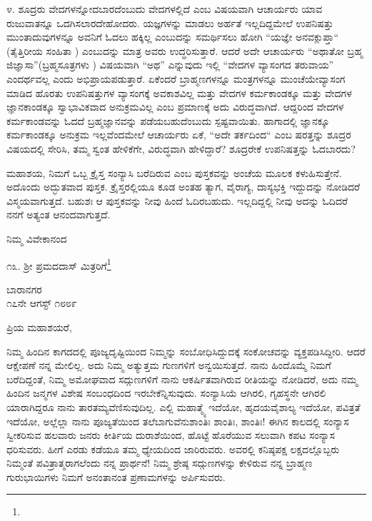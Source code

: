 ೪. ಶೂದ್ರರು ವೇದಗಳನ್ನೋದಬಾರದೆಂಬುದು ವೇದಗಳಲ್ಲಿದೆ ಎಂಬ ವಿಷಯವಾಗಿ ಆಚಾರ್ಯರು ಯಾವ ರುಜುವಾತನ್ನೂ ಒದಗಿಸಲಾರದೇಹೋದರು. ಯಜ್ಞಗಳನ್ನು ಮಾಡಲು ಅರ್ಹತೆ ಇಲ್ಲದಿದ್ದಮೇಲೆ ಉಪನಿಷತ್ತು ಮುಂತಾದುವುಗಳನ್ನೂ ಅವನಿಗೆ ಓದಲು ಹಕ್ಕಿಲ್ಲ ಎಂಬುದನ್ನು ಸಮರ್ಥಿಸಲು ಹೋಗಿ “ಯಜ್ಞೇ ಅನವಕ್ಲುಪ್ತಾ“ (ತೈತ್ತಿರೀಯ ಸಂಹಿತಾ ) ಎಂಬುದನ್ನು ಮಾತ್ರ ಅವರು ಉದ್ಧರಿಸುತ್ತಾರೆ. ಆದರೆ ಅದೇ ಆಚಾರ್ಯರು “ಅಥಾತೋ ಬ್ರಹ್ಮ ಜಿಜ್ಞಾಸಾ”(ಬ್ರಹ್ಮಸೂತ್ರಗಳು ) ವಿಷಯವಾಗಿ “ಅಥ” ಎನ್ನುವುದು ಇಲ್ಲಿ “ವೇದಗಳ ವ್ಯಾಸಂಗದ ತರುವಾಯ” ಎಂದರ್ಥವಲ್ಲ ಎಂದು ಅಭಿಪ್ರಾಯಪಡುತ್ತಾರೆ. ಏಕೆಂದರೆ ಬ್ರಾಹ್ಮಣಗಳನ್ನೂ ಮಂತ್ರಗಳನ್ನೂ ಮುಂಚೆಯೇ\break ವ್ಯಾಸಂಗ ಮಾಡಿದ ಹೊರತು ಉಪನಿಷತ್ತುಗಳ ವ್ಯಾಸಂಗಕ್ಕೆ ಅವಕಾಶವಿಲ್ಲ ಮತ್ತು ವೇದಗಳ ಕರ್ಮಕಾಂಡಕ್ಕೂ ಮತ್ತು ವೇದಗಳ ಜ್ಞಾನಕಾಂಡಕ್ಕೂ ಸ್ವಾಭಾವಿಕವಾದ ಅನುಕ್ರಮವಿಲ್ಲ ಎಂಬ ಪ್ರಮಾಣಕ್ಕೆ ಅದು ವಿರುದ್ಧವಾಗಿದೆ. ಆದ್ದರಿಂದ ವೇದಗಳ ಕರ್ಮಕಾಂಡವನ್ನು ಓದದೆ ಬ್ರಹ್ಮಜ್ಞಾನವನ್ನು ಪಡೆಯಬಹುದೆಂಬುದು ಸ್ಪಷ್ಟವಾಯಿತು. ಹಾಗಾದಲ್ಲಿ ಜ್ಞಾನಕ್ಕೂ ಕರ್ಮಕಾಂಡಕ್ಕೂ ಅನುಕ್ರಮ ಇಲ್ಲವೆಂದಮೇಲೆ ಆಚಾರ್ಯರು ಏಕೆ, “ಅದೇ ತರ್ಕದಿಂದ“ ಎಂಬ ಷರತ್ತನ್ನು ಶೂದ್ರರ ವಿಷಯದಲ್ಲಿ ಸೇರಿಸಿ, ತಮ್ಮ ಸ್ವಂತ ಹೇಳಿಕೆಗೇ, ವಿರುದ್ಧವಾಗಿ ಹೇಳಿದ್ದಾರೆ? ಶೂದ್ರರೇಕೆ ಉಪನಿಷತ್ತನ್ನು ಓದಬಾರದು?

ಮಹಾಶಯ, ನಿಮಗೆ ಒಬ್ಬ ಕ್ರೈಸ್ತ ಸಂನ್ಯಾಸಿ ಬರೆದಿರುವ  ಎಂಬ ಪುಸ್ತಕವನ್ನು ಅಂಚೆಯ ಮೂಲಕ ಕಳುಹಿಸುತ್ತೇನೆ. ಅದೊಂದು ಅದ್ಭುತವಾದ ಪುಸ್ತಕ. ಕ್ರೈಸ್ತರಲ್ಲಿಯೂ ಕೂಡ ಅಂತಹ ತ್ಯಾಗ, ವೈರಾಗ್ಯ, ದಾಸ್ಯಭಕ್ತಿ ಇದ್ದುದನ್ನು ನೋಡಿದರೆ ವಿಸ್ಮಯವಾಗುತ್ತದೆ. ಬಹುಶಃ ಆ ಪುಸ್ತಕವನ್ನು ನೀವು ಹಿಂದೆ ಓದಿರಬಹುದು. ಇಲ್ಲದಿದ್ದಲ್ಲಿ ನೀವು ಅದನ್ನು ಓದಿದರೆ ನನಗೆ ಅತ್ಯಂತ ಆನಂದವಾಗುತ್ತದೆ.

{\flushright
ನಿಮ್ಮ ವಿವೇಕಾನಂದ\par}

\vspace{-0.3cm}

\begin{center}
೧೩. ಶ‍್ರೀ ಪ್ರಮದದಾಸ್ ಮಿತ್ರರಿಗೆ\footnote{}
\end{center}

\vspace{-0.7cm}

\begin{flushright}
ಬಾರಾನಗರ\\೧೭ನೇ ಆಗಸ್ಟ್ ೧೮೮೯
\end{flushright}

\noindent
ಪ್ರಿಯ ಮಹಾಶಯರೆ,

ನಿಮ್ಮ ಹಿಂದಿನ ಕಾಗದದಲ್ಲಿ ಪೂಜ್ಯದೃಷ್ಟಿಯಿಂದ ನಿಮ್ಮನ್ನು ಸಂಬೋಧಿಸಿದ್ದುದಕ್ಕೆ ಸಂಕೋಚವನ್ನು ವ್ಯಕ್ತಪಡಿಸಿದ್ದೀರಿ. ಆದರೆ ಆಕ್ಷೇಪಣೆ ನನ್ನ ಮೇಲಿಲ್ಲ. ಅದು ನಿಮ್ಮ ಅತ್ಯುತ್ತಮ ಗುಣಗಳಿಗೆ ಅನ್ವಯಿಸುತ್ತದೆ. ನಾನು ಹಿಂದೊಮ್ಮೆ ನಿಮಗೆ ಬರೆದಿದ್ದಂತೆ, ನಿಮ್ಮ ಅಮೋಘವಾದ ಸದ್ಗುಣಗಳಿಗೆ ನಾನು ಆಕರ್ಷಿತವಾಗಿರುವ ರೀತಿಯನ್ನು ನೋಡಿದರೆ, ಅದು ನಮ್ಮ ಹಿಂದಿನ ಜನ್ಮಗಳ ವಿಶೇಷ ಸಂಬಂಧದಿಂದ ಇರಬೇಕೆನ್ನಿಸುವುದು. ಸಂನ್ಯಾಸಿಯೆ ಆಗಿರಲಿ, ಗೃಹಸ್ಥನೇ ಆಗಿರಲಿ ಯಾರಾಗಿದ್ದರೂ ನಾನು ತಾರತಮ್ಯವೆಣಿಸುವುದಿಲ್ಲ. ಎಲ್ಲಿ ಮಹಾತ್ಮ್ಯೆ ಇದೆಯೋ, ಹೃದಯವೈಶಾಲ್ಯ ಇದೆಯೋ, ಪವಿತ್ರತೆ ಇದೆಯೋ, ಅಲ್ಲೆಲ್ಲಾ ನಾನು ಪೂಜ್ಯತೆಯಿಂದ ತಲೆಬಾಗುವೆನು\enginline{-}ಶಾಂತಿಃ ಶಾಂತಿಃ, ಶಾಂತಿಃ! ಈಗಿನ ಕಾಲದಲ್ಲಿ ಸಂನ್ಯಾಸ ಸ್ವೀಕರಿಸುವ ಹಲವಾರು ಜನರು ಕೀರ್ತಿಯ ದುರಾಶೆಯಿಂದ, ಹೊಟ್ಟೆ \break  ಹೊರೆಯುವ ಸಲುವಾಗಿ ಕಪಟ ಸಂನ್ಯಾಸ ಧರಿಸುವರು. ಹೀಗೆ ಎರಡು ಕಡೆಯೂ ತಮ್ಮ ಧ್ಯೇಯದಿಂದ ಜಾರಿರುವರು. ಅವರಲ್ಲಿ ಕನಿಷ್ಠಪಕ್ಷ ಲಕ್ಷದಲ್ಲೊಬ್ಬರು ನಿಮ್ಮಂತೆ ಪವಿತ್ರಾತ್ಮರಾಗಲೆಂದು ನನ್ನ ಪ್ರಾರ್ಥನೆ! ನಿಮ್ಮ ಶ್ರೇಷ್ಠ ಸದ್ಗುಣಗಳನ್ನು ಕೇಳಿರುವ ನನ್ನ ಬ್ರಾಹ್ಮಣ ಗುರುಭಾಯಿಗಳು ನಿಮಗೆ ಅನಂತಾನಂತ ಪ್ರಣಾಮಗಳನ್ನು ಅರ್ಪಿಸುವರು.

